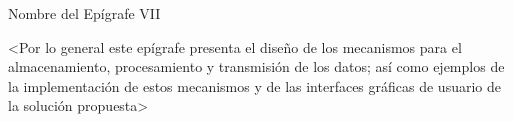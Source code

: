 \epigraph{Nombre del Epígrafe VII}{%
<Por lo general este epígrafe presenta el diseño de los mecanismos para el almacenamiento, procesamiento y transmisión de los datos; así como ejemplos de la implementación de estos mecanismos y de las interfaces gráficas de usuario de la solución propuesta>
}
